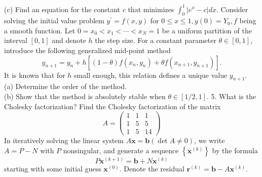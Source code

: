 \documentclass[14pt]{extarticle}
\begin{document}
(c) Find an equation for the constant $c$ that minimizes $\int_{0}^{1}\left|e^{x}-c\right| d x$.
\newpage
Consider solving the initial value problem $y^{\prime}=f(x, y)$ for $0 \leq x \leq 1, y(0)=Y_{0}, f$ being a smooth function. Let $0=x_{0}<x_{1}<\cdots<x_{N}=1$ be a uniform partition of the interval $[0,1]$ and denote $h$ the step size. For a constant parameter $\theta \in[0,1]$, introduce the following generalized mid-point method
$$
y_{n+1}=y_{n}+h\left[(1-\theta) f\left(x_{n}, y_{n}\right)+\theta f\left(x_{n+1}, y_{n+1}\right)\right] .
$$
It is known that for $h$ small enough, this relation defines a unique value $y_{n+1}$.\\
(a) Determine the order of the method.\\
(b) Show that the method is absolutely stable when $\theta \in[1 / 2,1]$. 5. What is the Cholesky factorization? Find the Cholesky factorization of the matrix
$$
A=\left(\begin{array}{ccc}
1 & 1 & 1 \\
1 & 5 & 5 \\
1 & 5 & 14
\end{array}\right)
$$
\newpage
In iteratively solving the linear system $A \boldsymbol{x}=\boldsymbol{b}(\operatorname{det} A \neq 0)$, we write $A=P-N$ with $P$ nonsingular, and generate a sequence $\left\{\boldsymbol{x}^{(k)}\right\}$ by the formula
$$
P \boldsymbol{x}^{(k+1)}=\boldsymbol{b}+N \boldsymbol{x}^{(k)}
$$
starting with some initial guess $\boldsymbol{x}^{(0)}$. Denote the residual $\boldsymbol{r}^{(k)}=\boldsymbol{b}-A \boldsymbol{x}^{(k)}$.
\end{document}
